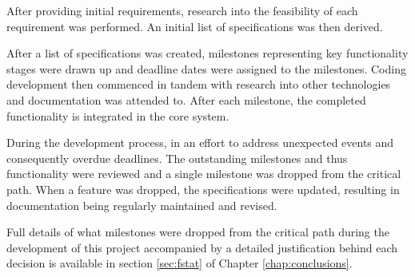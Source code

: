 After providing initial requirements, research into the feasibility of
each requirement was performed. An initial list of specifications was
then derived.


After a list of specifications was created, milestones representing key
functionality stages were drawn up and deadline dates were assigned to
the milestones. Coding development then commenced in tandem with 
research into other technologies and documentation was attended to. 
After each milestone, the completed functionality is integrated in the
core system.


During the development process, in an effort to address unexpected 
events and consequently overdue deadlines. The outstanding milestones 
and thus functionality were reviewed and a single milestone was dropped 
from the critical path. When a feature was dropped, the specifications 
were updated, resulting in documentation being regularly maintained and 
revised.


Full details of what milestones were dropped from the critical path
during the development of this project accompanied by a detailed
justification behind each decision is available in 
section \ref{sec:fstat} of Chapter \ref{chap:conclusions}.
